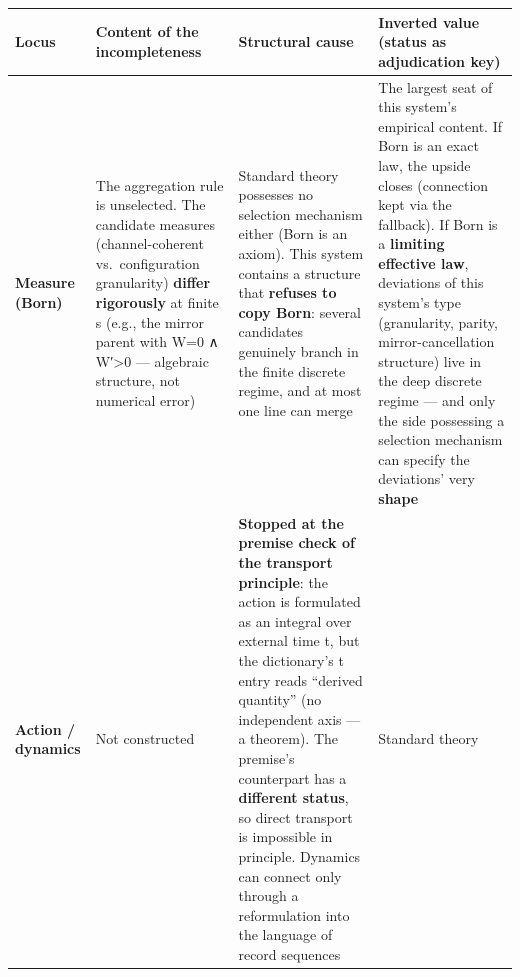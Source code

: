\documentclass[
]{article}
\newcounter{none} %
\begin{document}
{\def\LTcaptype{none} %
\begin{longtable}[]{@{}
  >{\raggedright\arraybackslash}p{}
  >{\raggedright\arraybackslash}p{}
  >{\raggedright\arraybackslash}p{}
  >{\raggedright\arraybackslash}p{}@{}}
\toprule\noalign{}
\begin{minipage}[b]{\linewidth}\raggedright
Locus
\end{minipage} & \begin{minipage}[b]{\linewidth}\raggedright
Content of the incompleteness
\end{minipage} & \begin{minipage}[b]{\linewidth}\raggedright
Structural cause
\end{minipage} & \begin{minipage}[b]{\linewidth}\raggedright
Inverted value (status as adjudication key)
\end{minipage} \\
\midrule\noalign{}
\endhead
\bottomrule\noalign{}
\endlastfoot
\textbf{Measure (Born)} & The aggregation rule is unselected. The
candidate measures (channel-coherent vs.~configuration granularity)
\textbf{differ rigorously} at finite s (e.g., the mirror parent with W=0
∧ W′\textgreater0 --- algebraic structure, not numerical error) &
Standard theory possesses no selection mechanism either (Born is an
axiom). This system contains a structure that \textbf{refuses to copy
Born}: several candidates genuinely branch in the finite discrete
regime, and at most one line can merge & The largest seat of this
system's empirical content. If Born is an exact law, the upside closes
(connection kept via the fallback). If Born is a \textbf{limiting
effective law}, deviations of this system's type (granularity, parity,
mirror-cancellation structure) live in the deep discrete regime --- and
only the side possessing a selection mechanism can specify the
deviations' very \textbf{shape} \\
\textbf{Action / dynamics} & Not constructed & \textbf{Stopped at the
premise check of the transport principle}: the action is formulated as
an integral over external time t, but the dictionary's t entry reads
``derived quantity'' (no independent axis --- a theorem). The premise's
counterpart has a \textbf{different status}, so direct transport is
impossible in principle. Dynamics can connect only through a
reformulation into the language of record sequences & Standard theory

\end{longtable}}
\end{document}
